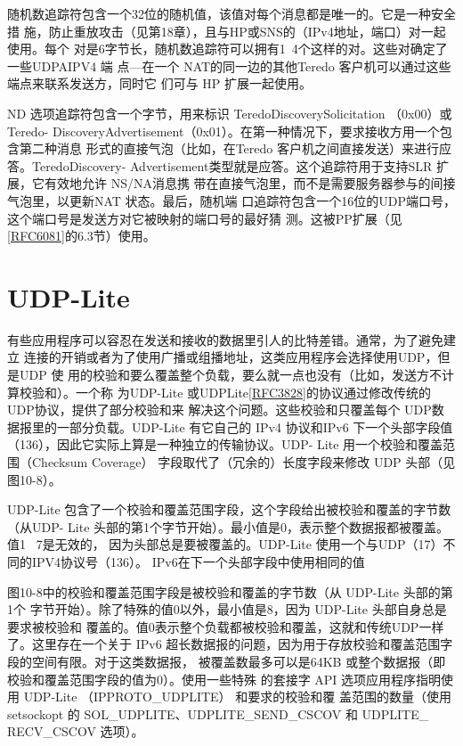 随机数追踪符包含一个32位的随机值，该值对每个消息都是唯一的。它是一种安全措
施，防止重放攻击（见第18章），且与HP或SNS的（IPv4地址，端口）对一起使用。每个
对是6字节长，随机数追踪符可以拥有1~4个这样的对。这些对确定了一些UDPAIPV4 端
点—在一个 NAT的同一边的其他Teredo 客户机可以通过这些端点来联系发送方，同时它
们可与 HP 扩展一起使用。

ND 选项追踪符包含一个字节，用来标识 TeredoDiscoverySolicitation （0x00）或 Teredo-
DiscoveryAdvertisement（0x01）。在第一种情况下，要求接收方用一个包含第二种消息
形式的直接气泡（比如，在Teredo 客户机之间直接发送）来进行应答。TeredoDiscovery-
Advertisement类型就是应答。这个追踪符用于支持SLR 扩展，它有效地允许 NS/NA消息携
带在直接气泡里，而不是需要服务器参与的间接气泡里，以更新NAT 状态。最后，随机端
口追踪符包含一个16位的UDP端口号，这个端口号是发送方对它被映射的端口号的最好猜
测。这被PP扩展（见\href{https://www.rfc-editor.org/rfc/rfc6081}{[RFC6081]}的6.3节）使用。

\section{UDP-Lite}
有些应用程序可以容忍在发送和接收的数据里引人的比特差错。通常，为了避免建立
连接的开销或者为了使用广播或组播地址，这类应用程序会选择使用UDP，但是UDP 使
用的校验和要么覆盖整个负载，要么就一点也没有（比如，发送方不计算校验和）。一个称
为UDP-Lite 或UDPLite\href{https://www.rfc-editor.org/rfc/rfc3828}{[RFC3828]}的协议通过修改传统的UDP协议，提供了部分校验和来
解决这个问题。这些校验和只覆盖每个 UDP数据报里的一部分负载。UDP-Lite 有它自己的
IPv4 协议和IPv6 下一个头部字段值（136），因此它实际上算是一种独立的传输协议。UDP-
Lite 用一个校验和覆盖范围（Checksum Coverage） 字段取代了（冗余的）长度字段来修改
UDP 头部（见图10-8）。

UDP-Lite 包含了一个校验和覆盖范围字段，这个字段给出被校验和覆盖的字节数（从UDP-
Lite 头部的第1个字节开始）。最小值是0，表示整个数据报都被覆盖。值1 ~7是无效的，
因为头部总是要被覆盖的。UDP-Lite 使用一个与UDP（17）不同的IPV4协议号（136）。
IPv6在下一个头部字段中使用相同的值

图10-8中的校验和覆盖范围字段是被校验和覆盖的字节数（从 UDP-Lite 头部的第1个
字节开始）。除了特殊的值0以外，最小值是8，因为 UDP-Lite 头部自身总是要求被校验和
覆盖的。值0表示整个负载都被校验和覆盖，这就和传统UDP一样了。这里存在一个关于
IPv6 超长数据报的问题，因为用于存放校验和覆盖范围字段的空间有限。对于这类数据报，
被覆盖数最多可以是64KB 或整个数据报（即校验和覆盖范围字段的值为0）。使用一些特殊
的套接字 API 选项应用程序指明使用 UDP-Lite （IPPROTO\_UDPLITE） 和要求的校验和覆
盖范围的数量（使用 setsockopt 的 SOL\_UDPLITE、UDPLITE\_SEND\_CSCOV 和 UDPLITE\_
RECV\_CSCOV 选项）。

